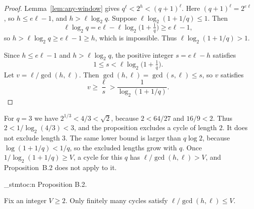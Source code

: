 \documentclass[11pt]{article}
\newenvironment{named}[1]{%
  \par\addvspace{\medskipamount}%
  \pagebreak[3]%
  \noindent{\bfseries #1}\space\ignorespaces
  \stmtoc{#1}%
}{\par\addvspace{\medskipamount}}
\newcommand{\stmtoc}[1]{ \qn_stmtoc:n {#1} }
\begin{document}
\begin{proof}
Lemma~\ref{lem:any-window} gives $q^\ell < 2^h < (q+1)^\ell$.
Here $(q+1)^\ell = 2^{e\ell}$, so $h \le e\ell - 1$, and $h > \ell\log_2 q$.
Suppose $\ell\log_2(1+1/q) \le 1$.
Then
\[
\ell\log_2 q = e\ell - \ell\log_2\bigl(1 + \tfrac1q\bigr) \ge e\ell - 1,
\]
so $h > \ell\log_2 q \ge e\ell - 1 \ge h$, which is impossible.
Thus $\ell\log_2(1+1/q) > 1$.

Since $h \le e\ell - 1$ and $h > \ell\log_2 q$, the positive integer $s = e\ell - h$ satisfies
\[
1 \le s < \ell\log_2\bigl(1 + \tfrac1q\bigr).
\]
Let $v = \ell/\gcd(h,\ell)$.
Then $\gcd(h,\ell) = \gcd(s,\ell) \le s$, so $v$ satisfies
\[
v \ge \frac{\ell}{s} > \frac{1}{\log_2(1+1/q)}.
\]
\end{proof}

For $q = 3$ we have $2^{1/3} < 4/3 < \sqrt{2}$, because $2 < 64/27$ and $16/9 < 2$.
Thus $2 < 1/\log_2(4/3) < 3$, and the proposition excludes a cycle of length $2$.
It does not exclude length $3$.
The same lower bound is larger than $q\log 2$, because $\log(1+1/q) < 1/q$, so the excluded lengths grow with $q$.
Once $1/\log_2(1+1/q) \ge V$, a cycle for this $q$ has $\ell/\gcd(h,\ell) > V$, and Proposition~B.2 does not apply to it.

\begin{named}{Proposition B.2.}
Fix an integer $V \ge 2$.
Only finitely many cycles satisfy $\ell/\gcd(h,\ell) \le V$.
\end{named}
\end{document}
